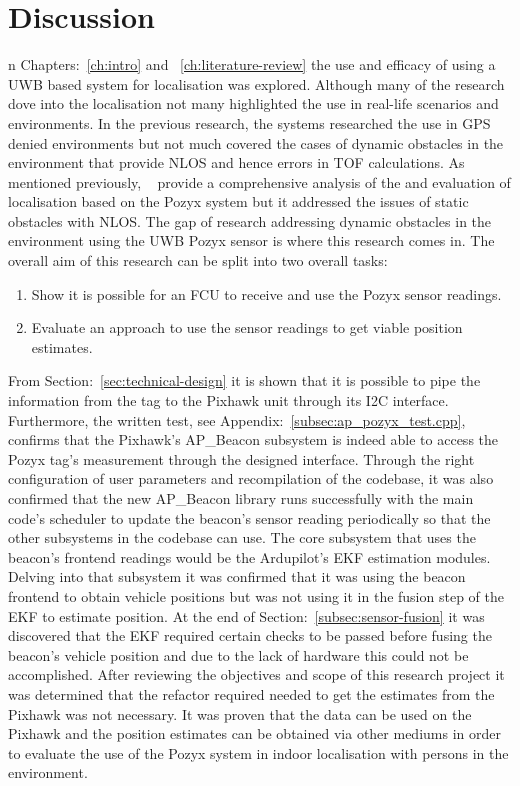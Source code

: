 \chapter{Discussion}\label{ch:discussion}
n Chapters:~\ref{ch:intro} and ~\ref{ch:literature-review} the use and efficacy of using a UWB based system for localisation was explored.
Although many of the research dove into the localisation not many highlighted the use in real-life scenarios and environments.
In the previous research, the systems researched the use in GPS denied environments but not much covered the cases of dynamic obstacles in the environment that provide NLOS and hence errors in TOF calculations.
As mentioned previously, ~\citet{evaluwb} provide a comprehensive analysis of the and evaluation of localisation based on the Pozyx system but it addressed the issues of static obstacles with NLOS.
The gap of research addressing dynamic obstacles in the environment using the UWB Pozyx sensor is where this research comes in.
The overall aim of this research can be split into two overall tasks:
\begin{enumerate}
    \item Show it is possible for an FCU to receive and use the Pozyx sensor readings.
    \item Evaluate an approach to use the sensor readings to get viable position estimates.
\end{enumerate}

From Section:~\ref{sec:technical-design} it is shown that it is possible to pipe the information from the tag to the Pixhawk unit through its I2C interface.
Furthermore, the written test, see Appendix:~\ref{subsec:ap_pozyx_test.cpp}, confirms that the Pixhawk's AP\_Beacon subsystem is indeed able to access the Pozyx tag's measurement through the designed interface.
Through the right configuration of user parameters and recompilation of the codebase, it was also confirmed that the new AP\_Beacon library runs successfully with the main code's scheduler to update the beacon's sensor reading periodically so that the other subsystems in the codebase can use.
The core subsystem that uses the beacon's frontend readings would be the Ardupilot's EKF estimation modules.
Delving into that subsystem it was confirmed that it was using the beacon frontend to obtain vehicle positions but was not using it in the fusion step of the EKF to estimate position.
At the end of Section:~\ref{subsec:sensor-fusion} it was discovered that the EKF required certain checks to be passed before fusing the beacon's  vehicle position and due to the lack of hardware this could not be accomplished.
After reviewing the objectives and scope of this research project it was determined that the refactor required needed to get the estimates from the Pixhawk was not necessary.
It was proven that the data can be used on the Pixhawk and the position estimates can be obtained via other mediums in order to evaluate the use of the Pozyx system in indoor localisation with persons in the environment.

